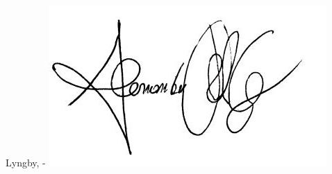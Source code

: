 \vspace{20mm}
\begin{center}
    \hspace{20mm} Lyngby, \thesishandin-\thesisyear
    \vspace{5mm}
    \newline
    \includegraphics[scale=0.5]{figures/signature}
\end{center}
\begin{flushright}
    \thesisauthor
\end{flushright}
